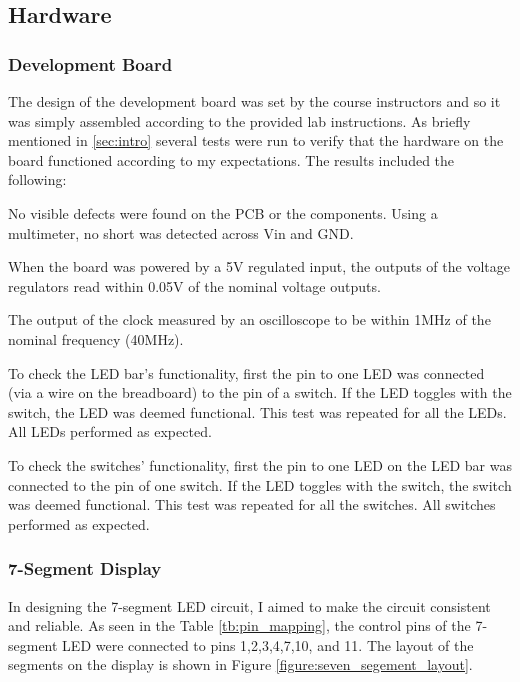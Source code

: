 \documentclass[11pt]{article}
\begin{document}
\subsection{Hardware}

\subsubsection{Development Board}

The design of the development board was set by the course instructors and so it was simply assembled according to the provided lab instructions. As briefly mentioned in \ref{sec:intro} several tests were run to verify that the hardware on the board functioned according to my expectations. The results included the following:

	\begin{description} \itemsep0pt
		\item[Pre-assembly Inspection ] No visible defects were found on the PCB or the components. Using a multimeter, no short was detected across Vin and GND.
		\item[Power Supply ] When the board was powered by a 5V regulated input, the outputs of the voltage regulators read within 0.05V of the nominal voltage outputs. 
		\item[Clock ] The output of the clock measured by an oscilloscope to be within 1MHz of the nominal frequency (40MHz).
		\item[LED Bar ] To check the LED bar's functionality, first the pin to one LED was connected (via a wire on the breadboard) to the pin of a switch. If the LED toggles with the switch, the LED was deemed functional. This test was repeated for all the LEDs. All LEDs performed as expected.
		\item[Switches ] To check the switches' functionality, first the pin to one LED on the LED bar was connected to the pin of one switch. If the LED toggles with the switch, the switch was deemed functional. This test was repeated for all the switches. All switches performed as expected.
		
		
	\end{description}


\subsubsection{7-Segment Display}




In designing the 7-segment LED circuit, I aimed to make the circuit consistent and reliable. As seen in the Table \ref{tb:pin_mapping}, the control pins of the 7-segment LED were connected to pins 1,2,3,4,7,10, and 11. The layout of the segments on the display is shown in Figure \ref{figure:seven_segement_layout}.
\end{document}
